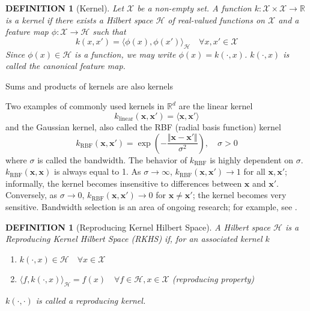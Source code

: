 \documentclass[a4paper,11pt]{article}
\newtheorem{definition}[theorem]{DEFINITION}
\begin{document}
\begin{definition}[Kernel]
    Let $\mathcal{X}$ be a non-empty set. A function $k: \mathcal{X} \times \mathcal{X} \rightarrow \mathbb{R}$ is a kernel if there exists a Hilbert space $\mathcal{H}$ of real-valued functions on $\mathcal{X}$ and a feature map $\phi: \mathcal{X} \rightarrow \mathcal{H}$ such that $$ k(x, x') = \langle \phi(x), \phi(x') \rangle_{\mathcal{H}} \quad \forall x, x' \in \mathcal{X} $$
    Since $\phi(x) \in \mathcal{H}$ is a function, we may write $\phi(x)=k(\cdot, x)$. $k(\cdot, x)$ is called the canonical feature map.
\end{definition}
Sums and products of kernels are also kernels

Two examples of commonly used kernels in $\mathbb{R}^{d}$ are the linear kernel
\begin{equation}
    k_{\text{linear}}(\mathbf{x}, \mathbf{x}') = \langle \mathbf{x}, \mathbf{x}' \rangle
    \label{eq:linear_kernel}
\end{equation}
and the Gaussian kernel, also called the RBF (radial basis function) kernel
\begin{equation}
    k_{\text{RBF}}(\mathbf{x}, \mathbf{x}') = \exp{\left( -\frac{\Vert \mathbf{x}-\mathbf{x}' \Vert}{\sigma^{2}} \right)}, \quad \sigma > 0
    \label{eq:gaussian_kernel}
\end{equation}
where $\sigma$ is called the bandwidth. The behavior of $k_{\text{RBF}}$ is highly dependent on $\sigma$. $k_{\text{RBF}}(\mathbf{x}, \mathbf{x})$ is always equal to 1. As $\sigma\rightarrow\infty$, $k_{\text{RBF}}(\mathbf{x}, \mathbf{x}') \rightarrow 1$ for all $\mathbf{x}, \mathbf{x}'$; informally, the kernel becomes insensitive to differences between $\mathbf{x}$ and $\mathbf{x}'$. Conversely, as $\sigma\rightarrow 0$, $k_{\text{RBF}}(\mathbf{x}, \mathbf{x}') \rightarrow 0$ for $\mathbf{x} \neq \mathbf{x}'$; the kernel becomes very sensitive. Bandwidth selection is an area of ongoing research; for example, see \cite{sutherland_generative_2019}.

\begin{definition}[Reproducing Kernel Hilbert Space]
    A Hilbert space $\mathcal{H}$ is a Reproducing Kernel Hilbert Space (RKHS) if, for an associated kernel $k$
    \begin{enumerate}
        \item $k(\cdot, x) \in \mathcal{H} \quad \forall x \in \mathcal{X}$
        \item $\langle f, k(\cdot, x) \rangle_{\mathcal{H}} = f(x) \quad \forall f \in \mathcal{H}, x \in \mathcal{X} $ (reproducing property)
    \end{enumerate}
    $k(\cdot, \cdot)$ is called a reproducing kernel.
\end{definition}
\end{document}
